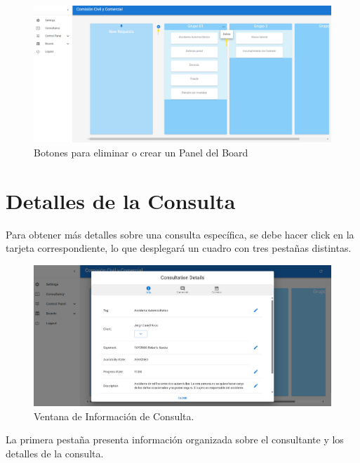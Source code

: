 \begin{figure}[H]
    \centering
    \includegraphics[width=1\linewidth]{fig/delete-panel.png}
    \caption{Botones para eliminar o crear un Panel del Board}
    \label{fig:delete-panel}
\end{figure}





\section{Detalles de la Consulta}\label{sec:info-consulta}

Para obtener más detalles sobre una consulta específica, se debe hacer click en la tarjeta correspondiente, lo que desplegará un cuadro con tres pestañas distintas.

\begin{figure}[H]
    \centering
    \includegraphics[width=1\linewidth]{fig/info-consulta.png}
    \caption{Ventana de Información de Consulta.}
    \label{fig:consulta-info}
\end{figure}

La primera pestaña presenta información organizada sobre el consultante y los detalles de la consulta.

